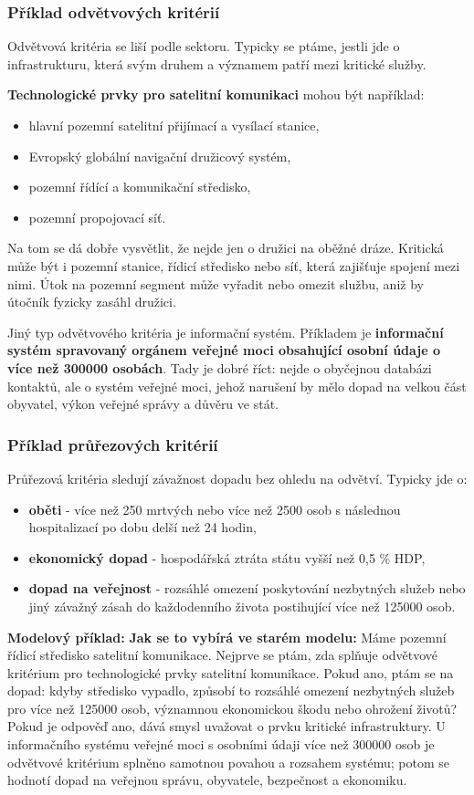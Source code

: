 \documentclass[11pt,a4paper]{article}
\newcommand{\modelovy}[1]{\begin{tcolorbox}[breakable,enhanced,colback=green!7,colframe=green!30!black,boxrule=0pt,arc=1mm,left=5pt,right=5pt,top=5pt,bottom=5pt,before skip=6pt,after skip=6pt]\textbf{Modelový příklad:} #1\end{tcolorbox}}
\begin{document}
\subsubsection*{Příklad odvětvových kritérií}
Odvětvová kritéria se liší podle sektoru. Typicky se ptáme, jestli jde o infrastrukturu, která svým druhem a významem patří mezi kritické služby.

\textbf{Technologické prvky pro satelitní komunikaci} mohou být například:
\begin{itemize}
  \item hlavní pozemní satelitní přijímací a vysílací stanice,
  \item Evropský globální navigační družicový systém,
  \item pozemní řídící a komunikační středisko,
  \item pozemní propojovací síť.
\end{itemize}
Na tom se dá dobře vysvětlit, že nejde jen o družici na oběžné dráze. Kritická může být i pozemní stanice, řídicí středisko nebo síť, která zajišťuje spojení mezi nimi. Útok na pozemní segment může vyřadit nebo omezit službu, aniž by útočník fyzicky zasáhl družici.

Jiný typ odvětvového kritéria je informační systém. Příkladem je \textbf{informační systém spravovaný orgánem veřejné moci obsahující osobní údaje o více než 300000 osobách}. Tady je dobré říct: nejde o obyčejnou databázi kontaktů, ale o systém veřejné moci, jehož narušení by mělo dopad na velkou část obyvatel, výkon veřejné správy a důvěru ve stát.

\subsubsection*{Příklad průřezových kritérií}
Průřezová kritéria sledují závažnost dopadu bez ohledu na odvětví. Typicky jde o:
\begin{itemize}
  \item \textbf{oběti} - více než 250 mrtvých nebo více než 2500 osob s následnou hospitalizací po dobu delší než 24 hodin,
  \item \textbf{ekonomický dopad} - hospodářská ztráta státu vyšší než 0,5 \% HDP,
  \item \textbf{dopad na veřejnost} - rozsáhlé omezení poskytování nezbytných služeb nebo jiný závažný zásah do každodenního života postihující více než 125000 osob.
\end{itemize}

\modelovy{\textbf{Jak se to vybírá ve starém modelu:} Máme pozemní řídicí středisko satelitní komunikace. Nejprve se ptám, zda splňuje odvětvové kritérium pro technologické prvky satelitní komunikace. Pokud ano, ptám se na dopad: kdyby středisko vypadlo, způsobí to rozsáhlé omezení nezbytných služeb pro více než 125000 osob, významnou ekonomickou škodu nebo ohrožení životů? Pokud je odpověď ano, dává smysl uvažovat o prvku kritické infrastruktury. U informačního systému veřejné moci s osobními údaji více než 300000 osob je odvětvové kritérium splněno samotnou povahou a rozsahem systému; potom se hodnotí dopad na veřejnou správu, obyvatele, bezpečnost a ekonomiku.}
\end{document}
